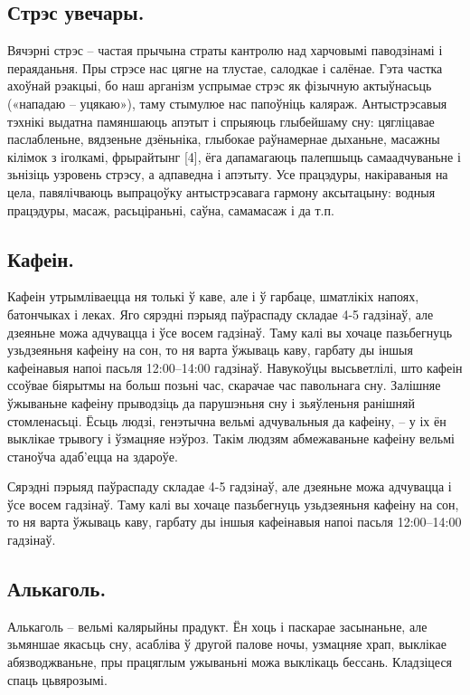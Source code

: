 \subsection{Стрэс увечары.}
Вячэрні стрэс – частая прычына страты кантролю над харчовымі паводзінамі і пераяданьня. Пры стрэсе нас цягне на тлустае, салодкае і салёнае. Гэта частка ахоўнай рэакцыі, бо наш арганізм успрымае стрэс як фізычную актыўнасьць («нападаю – уцякаю»), таму стымулюе нас папоўніць каляраж. Антыстрэсавыя тэхнікі выдатна памяншаюць апэтыт і спрыяюць глыбейшаму сну: цягліцавае паслабленьне, вядзеньне дзёньніка, глыбокае раўнамернае дыханьне, масажны кілімок з іголкамі, фрырайтынг [4], ёга дапамагаюць палепшыць самаадчуваньне і зьнізіць узровень стрэсу, а адпаведна і апэтыту. Усе працэдуры, накіраваныя на цела, павялічваюць выпрацоўку антыстрэсавага гармону аксытацыну: водныя працэдуры, масаж, расьціраньні, саўна, самамасаж і да т.п.

\subsection{Кафеін.}
Кафеін утрымліваецца ня толькі ў каве, але і ў гарбаце, шматлікіх напоях, батончыках і леках. Яго сярэдні пэрыяд паўраспаду складае 4-5 гадзінаў, але дзеяньне можа адчувацца і ўсе восем гадзінаў. Таму калі вы хочаце пазьбегнуць узьдзеяньня кафеіну на сон, то ня варта ўжываць каву, гарбату ды іншыя кафеінавыя напоі пасьля 12:00–14:00 гадзінаў. Навукоўцы высьветлілі, што кафеін ссоўвае біярытмы на больш позьні час, скарачае час павольнага сну. Залішняе ўжываньне кафеіну прыводзіць да парушэньня сну і зьяўленьня ранішняй стомленасьці. Ёсьць людзі, генэтычна вельмі адчувальныя да кафеіну, – у іх ён выклікае трывогу і ўзмацняе нэўроз. Такім людзям абмежаваньне кафеіну вельмі станоўча адаб'ецца на здароўе.

Сярэдні пэрыяд паўраспаду складае 4-5 гадзінаў, але дзеяньне можа адчувацца і ўсе восем гадзінаў. Таму калі вы хочаце пазьбегнуць узьдзеяньня кафеіну на сон, то ня варта ўжываць каву, гарбату ды іншыя кафеінавыя напоі пасьля 12:00–14:00 гадзінаў.

\subsection{Алькаголь.}
Алькаголь – вельмі калярыйны прадукт. Ён хоць і паскарае засынаньне, але зьмяншае якасьць сну, асабліва ў другой палове ночы, узмацняе храп, выклікае абязводжваньне, пры працяглым ужываньні можа выклікаць бессань. Кладзіцеся спаць цьвярозымі.

